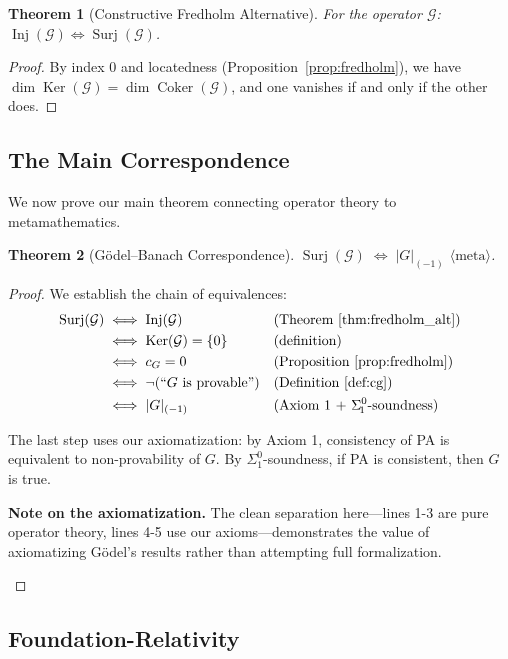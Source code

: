 \documentclass[11pt]{article}
\newtheorem{theorem}{Theorem}[section]
\theoremstyle{definition}
\newcommand{\SigOne}{\Sigma^{0}_{\!1}}
\DeclareMathOperator{\Ker}{Ker}
\DeclareMathOperator{\Coker}{Coker}
\DeclareMathOperator{\Surj}{Surj}
\DeclareMathOperator{\Inj}{Inj}
\newcommand{\trunc}[1]{\lvert #1\rvert_{(-1)}}
\newcommand{\meta}{\langle\text{meta}\rangle}
\begin{document}
\begin{theorem}[Constructive Fredholm Alternative]\label{thm:fredholm_alt}
For the operator $\mathcal{G}$: $\Inj(\mathcal{G}) \iff \Surj(\mathcal{G})$.
\end{theorem}
\begin{proof}
By index 0 and locatedness (Proposition~\ref{prop:fredholm}), we have $\dim\Ker(\mathcal{G}) = \dim\Coker(\mathcal{G})$, and one vanishes if and only if the other does.
\end{proof}

\subsection{The Main Correspondence}

We now prove our main theorem connecting operator theory to metamathematics.

\begin{theorem}[Gödel--Banach Correspondence]\label{thm:GBC}
$\Surj(\mathcal{G}) \;\Longleftrightarrow\; \trunc{G}$ $\meta$.
\end{theorem}
\begin{proof}
We establish the chain of equivalences:
\begin{align}
\Surj(\mathcal{G}) &\iff \Inj(\mathcal{G}) &&\text{(Theorem~\ref{thm:fredholm_alt})} \\
&\iff \Ker(\mathcal{G})=\{0\} &&\text{(definition)} \\
&\iff c_G=0 &&\text{(Proposition~\ref{prop:fredholm})} \\
&\iff \neg(\text{``$G$ is provable''}) &&\text{(Definition~\ref{def:cg})} \\
&\iff \trunc{G} &&\text{(Axiom 1 + $\SigOne$-soundness)}
\end{align}

The last step uses our axiomatization: by Axiom 1, consistency of PA is equivalent to non-provability of $G$. By $\SigOne$-soundness, if PA is consistent, then $G$ is true.

\smallskip
\noindent
\begin{mdframed}[backgroundcolor=yellow!10,roundcorner=4pt]
\textbf{Note on the axiomatization.}
The clean separation here---lines 1-3 are pure operator theory, lines 4-5 use our axioms---demonstrates the value of axiomatizing Gödel's results rather than attempting full formalization.
\end{mdframed}
\end{proof}

\subsection{Foundation-Relativity}
\end{document}
